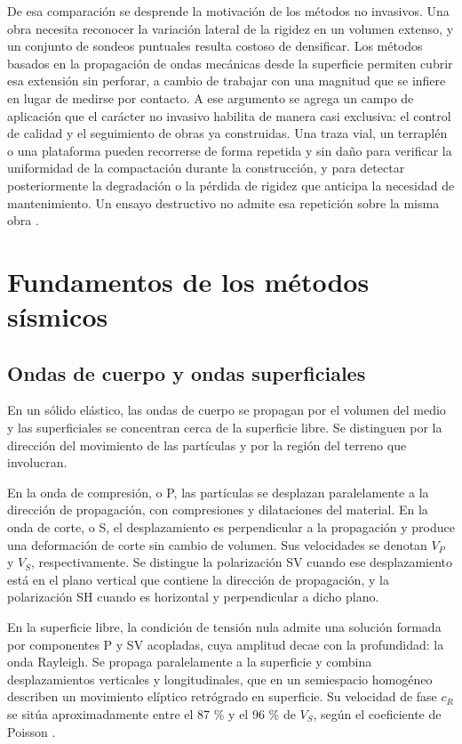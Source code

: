 De esa comparación se desprende la motivación de los métodos no invasivos. Una obra necesita reconocer la variación lateral de la rigidez en un volumen extenso, y un conjunto de sondeos puntuales resulta costoso de densificar. Los métodos basados en la propagación de ondas mecánicas desde la superficie permiten cubrir esa extensión sin perforar, a cambio de trabajar con una magnitud que se infiere en lugar de medirse por contacto. A ese argumento se agrega un campo de aplicación que el carácter no invasivo habilita de manera casi exclusiva: el control de calidad y el seguimiento de obras ya construidas. Una traza vial, un terraplén o una plataforma pueden recorrerse de forma repetida y sin daño para verificar la uniformidad de la compactación durante la construcción, y para detectar posteriormente la degradación o la pérdida de rigidez que anticipa la necesidad de mantenimiento. Un ensayo destructivo no admite esa repetición sobre la misma obra .

\section{Fundamentos de los métodos sísmicos}
\label{sec:fundamentos}

\subsection{Ondas de cuerpo y ondas superficiales}
\label{sec:ondas}

En un sólido elástico, las ondas de cuerpo se propagan por el volumen del medio y las superficiales se concentran cerca de la superficie libre. Se distinguen por la dirección del movimiento de las partículas y por la región del terreno que involucran.

En la onda de compresión, o P, las partículas se desplazan paralelamente a la dirección de propagación, con compresiones y dilataciones del material. En la onda de corte, o S, el desplazamiento es perpendicular a la propagación y produce una deformación de corte sin cambio de volumen. Sus velocidades se denotan $V_P$ y $V_S$, respectivamente. Se distingue la polarización SV cuando ese desplazamiento está en el plano vertical que contiene la dirección de propagación, y la polarización SH cuando es horizontal y perpendicular a dicho plano.

En la superficie libre, la condición de tensión nula admite una solución formada por componentes P y SV acopladas, cuya amplitud decae con la profundidad: la onda Rayleigh. Se propaga paralelamente a la superficie y combina desplazamientos verticales y longitudinales, que en un semiespacio homogéneo describen un movimiento elíptico retrógrado en superficie. Su velocidad de fase $c_R$ se sitúa aproximadamente entre el 87 \% y el 96 \% de $V_S$, según el coeficiente de Poisson .

